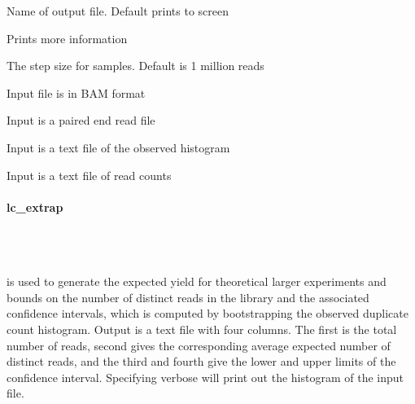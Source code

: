 \documentclass[11pt, titlepage]{article}
\begin{document}
\begin{description}[style=multiline,leftmargin=6cm,font=\ttfamily]
\item[\begingroup \fontsize{9pt}{12pt}\selectfont-o, -output\endgroup] Name of output file. Default prints to screen
\item[\begingroup \fontsize{9pt}{12pt}\selectfont-v -verbose\endgroup] Prints more information
\item[\begingroup \fontsize{9pt}{12pt}\selectfont-s, -step\endgroup] The step size for samples. Default is 1 million reads
\item[\begingroup \fontsize{9pt}{12pt}\selectfont-B, -bam\endgroup] Input file is in BAM format
\item[\begingroup \fontsize{9pt}{12pt}\selectfont-P, -pe\endgroup] Input is a paired end read file
\item[\begingroup \fontsize{9pt}{12pt}\selectfont-H, -hist\endgroup] Input is a text file of the observed histogram
\item[\begingroup \fontsize{9pt}{12pt}\selectfont-V, -vals\endgroup] Input is a text file of read counts
\end{description}

\paragraph{lc\_extrap}~\\~\\[-.2cm]
\label{sec:librarycomplexity}

 is used to generate
the expected yield for theoretical larger
experiments and bounds on the number of distinct 
reads in the library and the associated confidence
intervals, which is computed by bootstrapping the observed duplicate count histogram.
Output is a text file with four columns.  The
first is the total number of reads, second
gives the corresponding average
expected number of distinct reads, and the 
third and fourth give the lower and
upper
limits of the confidence interval.
Specifying verbose will print out the histogram
of the input file.  
\end{document}
